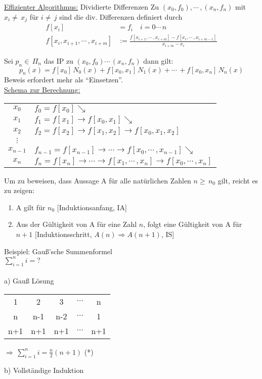 \underline{Effizienter Algorithmus:} Dividierte Differenzen
Zu $(x_0,f_0),\cdots\,,(x_n,f_n)$ mit $x_i\neq\,x_j$ für $i\neq\,j$ sind die div. Differenzen definiert durch
\begin{align*}
f[x_i] &= f_i \quad i=0\cdots\,n\\
f[x_i,x_{i+1},\cdots\,,x_{i+m}] &:= \frac{f[x_{i+1},\cdots\,,x_{i+m}]-f[x_{i},\cdots\,,x_{i+m-1}]}{x_{i+m}-x_i}
\end{align*}

Sei $p_n\in\,\Pi_n$ das IP zu $(x_0,f_0)\cdots\,(x_n,f_n)$ dann gilt:
\begin{equation*}
p_n(x) = f[x_0]\,N_0(x)+f[x_0,x_1]\,N_1(x)+\cdots\,+f[x_0,x_n]\,N_n(x)
\end{equation*}
Beweis erfordert mehr als "`Einsetzen"'. \\
\underline{Schema zur Berechnung:}

\begin{tabular}{c|l}
$x_0$ & $f_0 = f[x_0] \searrow$ \\
$x_1$ & $f_1 = f[x_1] \rightarrow f[x_0,x_1]  \searrow$ \\
$x_2$ & $f_2 = f[x_2] \rightarrow f[x_1,x_2] \rightarrow f[x_0,x_1,x_2]$\\
$\vdots$ &  \\
$x_{n-1}$ & $f_{n-1} = f[x_{n-1}] \rightarrow \cdots \rightarrow f[x_0,\cdots\,,x_{n-1}] \searrow$\\
$x_n$ & $f_n = f[x_n] \rightarrow \cdots \rightarrow f[x_1,\cdots\,,x_n] \rightarrow f[x_0,\cdots\,,x_n]$ \\
\end{tabular}

Um zu beweisen, dass Aussage A für alle natürlichen Zahlen $n\geq\,n_0$ gilt, reicht es zu zeigen:

\begin{enumerate}
	\item A gilt für $n_0$ [Induktionsanfang, IA] 
	\item Aus der Gültigkeit von A für eine Zahl $n$, folgt eine Gültigkeit von A für $n+1$ [Induktionsschritt, $A(n)\Rightarrow A(n+1)$, IS]
\end{enumerate}

Beispiel: Gauß'sche Summenformel\\
$\sum\limits_{i=1}^{n}{i}=?$\\\\
a) Gauß Lösung\\
\begin{center}
\begin{tabular}{c|c|c|c|c}
	1 & 2 & 3 & $\cdots$ & n \\
	n & n-1 & n-2 & $\cdots$ & 1 \\\hline
  n+1 & n+1 & n+1 & $\cdots$ & n+1
\end{tabular}
$\Rightarrow\,\sum\limits_{i=1}^{n}{i}=\frac{n}{2}(n+1)$ (*)\\
\end{center}
b) Vollständige Induktion

